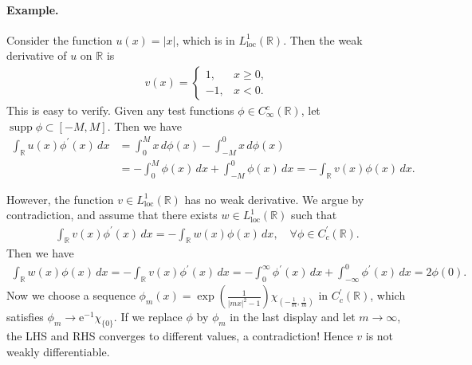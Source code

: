 \documentclass{article}
\numberwithin{equation}{section}
\newcommand{\e}{\mathrm{e}}
\newcommand{\bbR}{\mathbb{R}}
\newcommand{\loc}{\mathrm{loc}}
\DeclareMathOperator{\supp}{supp}
\theoremstyle{plain}
\theoremstyle{definition}
\begin{document}
\paragraph{Example.} Consider the function $u(x)=\vert x\vert$, which is in $L^1_\loc(\bbR)$. Then the weak derivative of $u$ on $\bbR$ is
\begin{align*}
	v(x)=\begin{cases}
		1, &x\geq 0, \\ -1, &x<0.
	\end{cases}
\end{align*}
This is easy to verify. Given any test functions $\phi\in C^c_\infty(\bbR)$, let $\supp\phi\subset[-M,M]$. Then we have
\begin{align*}
	\int_{\bbR}u(x)\phi^\prime(x)\,dx&=\int_0^M x\,d\phi(x)-\int_{-M}^0 x\,d\phi(x)\\
	&=-\int_0^M\phi(x)\,dx+\int_{-M}^0\phi(x)\,dx=-\int_{\bbR}v(x)\phi(x)\,dx.
\end{align*}

However, the function $v\in L^1_\loc(\bbR)$ has no weak derivative. We argue by contradiction, and assume that there exists $w\in L^1_\loc(\bbR)$ such that
\begin{align*}
	\int_\bbR v(x)\phi^\prime(x)\,dx=-\int_\bbR w(x)\phi(x)\,dx,\quad\forall\phi\in C_c^\prime(\bbR).
\end{align*}
Then we have
\begin{align*}
	\int_\bbR w(x)\phi(x)\,dx=-\int_\bbR v(x)\phi^\prime(x)\,dx=-\int_0^\infty\phi^\prime(x)\,dx+\int_{-\infty}^0\phi^\prime(x)\,dx=2\phi(0).
\end{align*}
Now we choose a sequence $\phi_m(x)=\exp\left(\frac{1}{\vert mx\vert^2-1}\right)\chi_{(-\frac{1}{m},\frac{1}{m})}$ in $C_c^\prime(\bbR)$, which satisfies $\phi_m\to\e^{-1}\chi_{\{0\}}$. If we replace $\phi$ by $\phi_m$ in the last display and let $m\to\infty$, the LHS and RHS converges to different values, a contradiction! Hence $v$ is not weakly differentiable.
\end{document}

